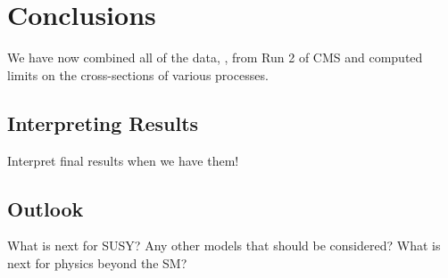 \chapter{Conclusions}
\label{ch:Conclusions}

We have now combined all of the data, \datalumi{}, from Run 2 of CMS and computed limits on the cross-sections of various \st{} processes. 

\section{Interpreting Results}
\label{sec:Interp}

Interpret final results when we have them!

\section{Outlook}
\label{sec:outlook}

What is next for SUSY? Any other models that should be considered? What is next for physics beyond the SM?

